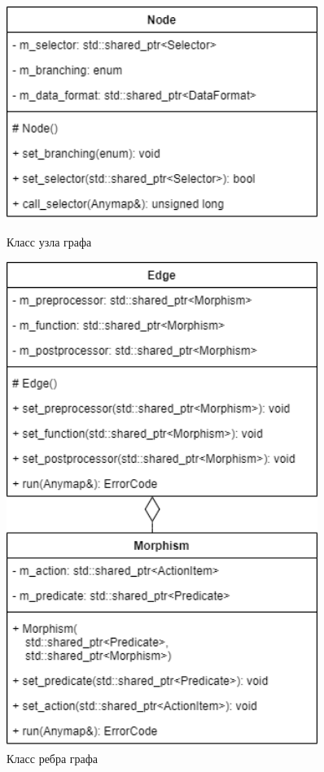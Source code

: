 \begin{figure}[!ht]
    \centering
    \begin{minipage}{0.455\textwidth}
        \centering
        \includegraphics[width=0.9\textwidth]{figures/class.node.png}
        \caption{Класс узла графа}
        \label{fig:classNode}
    \end{minipage}\hfill
    \begin{minipage}{0.455\textwidth}
        \centering
        \includegraphics[width=0.9\textwidth]{figures/class.edge.png}
        \caption{Класс ребра графа}
        \label{fig:classEdge}
    \end{minipage}
\end{figure}

